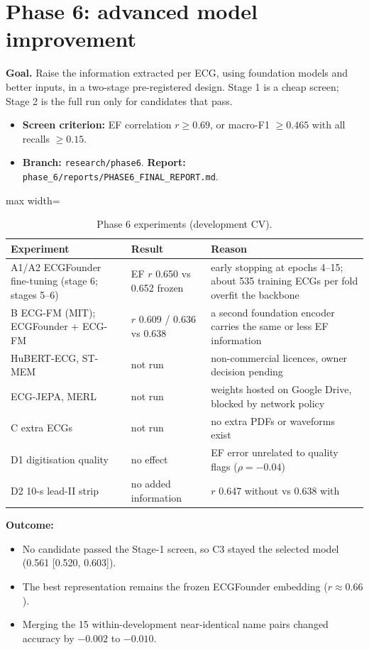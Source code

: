 \section{Phase 6: advanced model improvement}\label{sec:p6}
\textbf{Goal.} Raise the information extracted per ECG, using foundation models and better inputs, in a two-stage
pre-registered design. Stage 1 is a cheap screen; Stage 2 is the full run only for candidates that pass.
\begin{itemize}
  \item \textbf{Screen criterion:} EF correlation $r\ge 0.69$, or macro-F1 $\ge 0.465$ with all recalls $\ge 0.15$.
  \item \textbf{Branch:} \texttt{research/phase6}. \textbf{Report:} \texttt{phase\_6/reports/PHASE6\_FINAL\_REPORT.md}.
\end{itemize}

\begin{table}[H]\centering\small
\caption{Phase 6 experiments (development CV).}\label{tab:p6}
\begin{adjustbox}{max width=\linewidth}
\begin{tabular}{p{5.3cm}p{3.2cm}p{5.6cm}}\toprule
Experiment & Result & Reason \\\midrule
A1/A2 ECGFounder fine-tuning (stage 6; stages 5--6) & EF $r$ 0.650 vs 0.652 frozen & early stopping at epochs 4--15; about 535 training ECGs per fold overfit the backbone \\
B ECG-FM (MIT); ECGFounder + ECG-FM & $r$ 0.609 / 0.636 vs 0.638 & a second foundation encoder carries the same or less EF information \\
HuBERT-ECG, ST-MEM & not run & non-commercial licences, owner decision pending \\
ECG-JEPA, MERL & not run & weights hosted on Google Drive, blocked by network policy \\
C extra ECGs & not run & no extra PDFs or waveforms exist \\
D1 digitisation quality & no effect & EF error unrelated to quality flags ($\rho=-0.04$) \\
D2 10-s lead-II strip & no added information & $r$ 0.647 without vs 0.638 with \\\bottomrule
\end{tabular}
\end{adjustbox}
\end{table}
\textbf{Outcome:}
\begin{itemize}
  \item No candidate passed the Stage-1 screen, so C3 stayed the selected model (0.561 [0.520, 0.603]).
  \item The best representation remains the frozen ECGFounder embedding ($r\approx0.66$).
  \item Merging the 15 within-development near-identical name pairs changed accuracy by $-0.002$ to $-0.010$.
\end{itemize}

